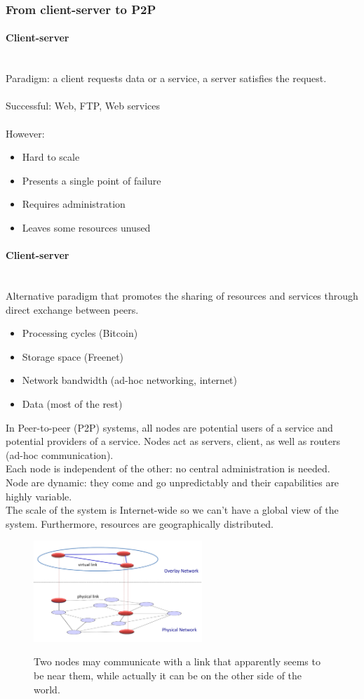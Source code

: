 \documentclass[10pt,a4paper]{article}
\newcommand{\myparagraph}[1]{\paragraph{#1}\mbox{}\\[0.05in]}
\begin{document}
\subsubsection{From client-server to P2P}
\myparagraph{Client-server}
Paradigm: a client requests data or a service, a server satisfies the request. \\ \\
Successful: Web, FTP, Web services \\ \\
However:
\begin{itemize}
	\item Hard to scale
	\item Presents a single point of failure
	\item Requires administration
	\item Leaves some resources unused
\end{itemize}
\myparagraph{Client-server}
Alternative paradigm that promotes the sharing of resources and services through direct exchange between peers.
\begin{itemize}
	\item Processing cycles (Bitcoin)
	\item Storage space (Freenet)
	\item Network bandwidth (ad-hoc networking, internet)
	\item Data (most of the rest)
\end{itemize}
In Peer-to-peer (P2P) systems, all nodes are potential users of a service and potential providers of a service. Nodes act as servers, client, as well as routers (ad-hoc communication). \\ Each node is independent of the other: no central administration is needed. \\ Node are dynamic: they come and go unpredictably and their capabilities are highly variable. \\ The scale of the system is Internet-wide so we can't have a global view of the system. Furthermore, resources are geographically distributed.
\begin{figure}[h!]
\hfill \includegraphics[width=180pt]{images/p2p-overlay.png}\hspace*{\fill}
  \label{fig:p2p-overlay}
  \caption{Two nodes may communicate with a link that apparently seems to be near them, while actually it can be on the other side of the world.}
\end{figure} 
\end{document}
